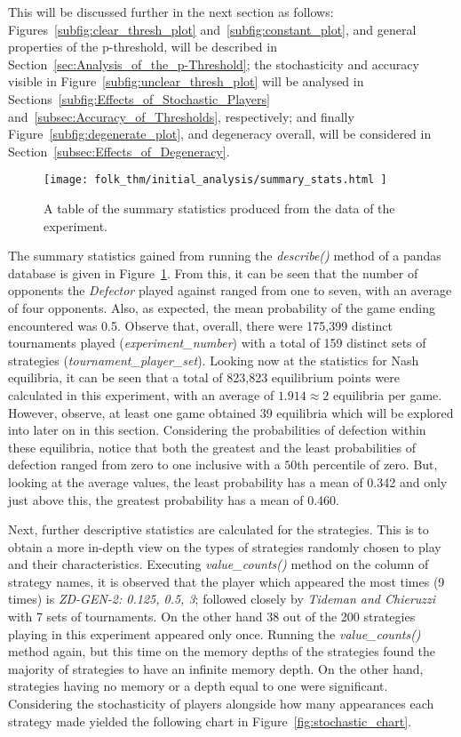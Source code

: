 This will be discussed further in the next section as follows:
Figures~\ref{subfig:clear_thresh_plot} and~\ref{subfig:constant_plot}, and
general properties of the p-threshold, will be described in
Section~\ref{sec:Analysis_of_the_p-Threshold}; the stochasticity and accuracy
visible in Figure~\ref{subfig:unclear_thresh_plot} will be analysed in
Sections~\ref{subfig:Effects_of_Stochastic_Players}
and~\ref{subsec:Accuracy_of_Thresholds}, respectively; and finally
Figure~\ref{subfig:degenerate_plot}, and degeneracy overall, will be considered
in Section~\ref{subsec:Effects_of_Degeneracy}.

\begin{figure}
    \centering
    \texttt{[image: folk\_thm/initial\_analysis/summary\_stats.html
    ]}
    \caption{A table of the summary statistics produced from the data of the experiment.}\label{fig:summary_stats}
\end{figure}

The summary statistics gained from running the \textit{describe()} method of a
pandas database is given in Figure~\ref{fig:summary_stats}. From this, it can be
seen that the number of opponents the \textit{Defector} played against ranged
from one to seven, with an average of four opponents. Also, as expected, the
mean probability of the game ending encountered was 0.5. Observe that, overall,
there were 175,399 distinct tournaments played (\textit{experiment_number}) with
a total of 159 distinct sets of strategies (\textit{tournament_player_set}).
Looking now at the statistics for Nash equilibria, it can be seen that a total
of 823,823 equilibrium points were calculated in this experiment, with an
average of \(1.914 \approx 2\) equilibria per game. However, observe, at least
one game obtained 39 equilibria which will be explored into later on in this
section. Considering the probabilities of defection within these equilibria,
notice that both the greatest and the least probabilities of defection ranged
from zero to one inclusive with a \(50\)th percentile of zero. But, looking at
the average values, the least probability has a mean of 0.342 and only just
above this, the greatest probability has a mean of 0.460.

Next, further descriptive statistics are calculated for the strategies. This is
to obtain a more in-depth view on the types of strategies randomly chosen to
play and their characteristics. Executing \textit{value_counts()} method on the
column of strategy names, it is observed that the player which appeared the most
times (9 times) is \textit{ZD-GEN-2: 0.125, 0.5, 3}; followed closely by
\textit{Tideman and Chieruzzi} with 7 sets of tournaments. On the other hand 38
out of the 200 strategies playing in this experiment appeared only once.
Running the \textit{value_counts()} method again, but this time on the memory
depths of the strategies found the majority of strategies to have an infinite
memory depth. On the other hand, strategies having no memory or a depth equal to
one were significant. Considering the stochasticity of players alongside how
many appearances each strategy made yielded the following chart in
Figure~\ref{fig:stochastic_chart}.

